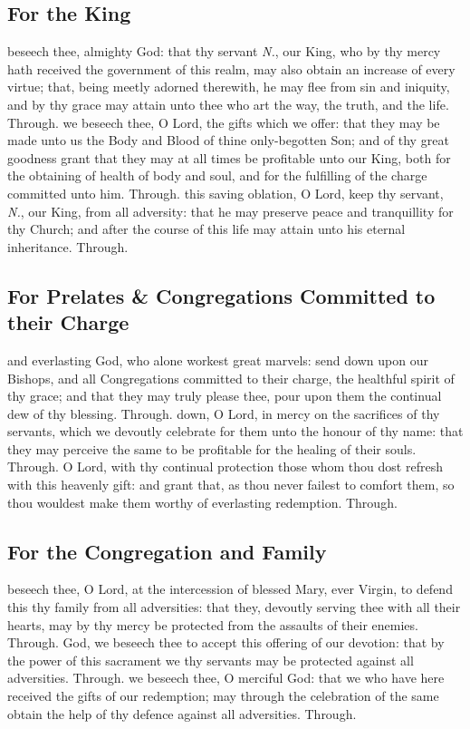 \begin{multicols}{2}
\subsection{For the King}
\collect
{} beseech thee, almighty God: that thy servant \textit{N.}, our King, who by thy mercy hath received the government of this realm, may also obtain an increase of every virtue; that, being meetly adorned therewith, he may flee from sin and iniquity, and by thy grace may attain unto thee who art the way, the truth, and the life. Through.
\secret
{} we beseech thee, O Lord, the gifts which we offer: that they may be made unto us the Body and Blood of thine only-begotten Son; and of thy great goodness grant that they may at all times be profitable unto our King, both for the obtaining of health of body and soul, and for the fulfilling of the charge committed unto him. Through.
\postcommunion
{} this saving oblation, O Lord, keep thy servant, \textit{N.}, our King, from all adversity: that he may preserve peace and tranquillity for thy Church; and after the course of this life may attain unto his eternal inheritance. Through.

   \newcolumn

\subsection{For Prelates \& Congregations Committed to their Charge}
\collect
{} and everlasting God, who alone workest great marvels: send down upon our Bishops, and all Congregations committed to their charge, the healthful spirit of thy grace; and that they may truly please thee, pour upon them the continual dew of thy blessing. Through.
\secret
{} down, O Lord, in mercy on the sacrifices of thy servants, which we devoutly celebrate for them unto the honour of thy name: that they may perceive the same to be profitable for the healing of their souls. Through.
\postcommunion
{} O Lord, with thy continual protection those whom thou dost refresh with this heavenly gift: and grant that, as thou never failest to comfort them, so thou wouldest make them worthy of everlasting redemption. Through.

   \newcolumn

\subsection{For the Congregation and Family}
\collect
{} beseech thee, O Lord, at the intercession of blessed Mary, ever Virgin, to defend this thy family from all adversities: that they, devoutly serving thee with all their hearts, may by thy mercy be protected from the assaults of their enemies. Through.
\secret
{} God, we beseech thee to accept this offering of our devotion: that by the power of this sacrament we thy servants may be protected against all adversities. Through.
\postcommunion
{} we beseech thee, O merciful God: that we who have here received the gifts of our redemption; may through the celebration of the same obtain the help of thy defence against all adversities. Through.



\end{multicols}
